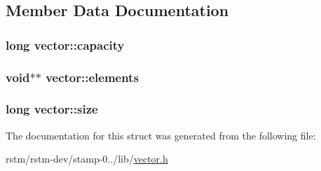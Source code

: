 \subsection{Member Data Documentation}
\hypertarget{structvector_af8408bb11649ee1613d18bbe714ff093}{
\subsubsection[{capacity}]{\setlength{\rightskip}{0pt plus 5cm}long vector\-::capacity}}\label{structvector_af8408bb11649ee1613d18bbe714ff093}
\hypertarget{structvector_a0936ad81a96d3e9b406b655fd42d3b82}{
\subsubsection[{elements}]{\setlength{\rightskip}{0pt plus 5cm}void$\ast$$\ast$ vector\-::elements}}\label{structvector_a0936ad81a96d3e9b406b655fd42d3b82}
\hypertarget{structvector_a8889986a7341960ef1671f4d37bdbac7}{
\subsubsection[{size}]{\setlength{\rightskip}{0pt plus 5cm}long vector\-::size}}\label{structvector_a8889986a7341960ef1671f4d37bdbac7}


The documentation for this struct was generated from the following file\-:\begin{DoxyCompactItemize}
\item 
rstm/rstm-\/dev/stamp-\/0../lib/\hyperlink{vector_8h}{vector.\-h}\end{DoxyCompactItemize}
